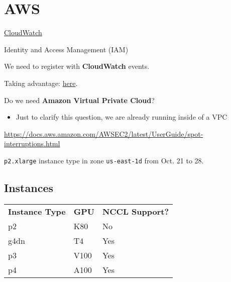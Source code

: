 \chapter{AWS}
\label{ch:aws}

\href{https://docs.aws.amazon.com/cloudwatch/index.html}{CloudWatch}

Identity and Access Management (IAM)

We need to register with \textbf{CloudWatch} events.

Taking advantage:
\href{https://aws.amazon.com/blogs/compute/taking-advantage-of-amazon-ec2-spot-instance-interruption-notices/}{here}.

Do we need \textbf{Amazon Virtual Private Cloud}?
\begin{itemize}
    \item Just to clarify this question, we are already running inside of a VPC
\end{itemize}

\url{https://docs.aws.amazon.com/AWSEC2/latest/UserGuide/spot-interruptions.html}




\texttt{p2.xlarge} instance type in zone \texttt{us-east-1d} from Oct. 21 to 28.




\section{Instances}
\vspace{-2em}
\begin{table}
  \begin{tabular}{|l|l|l|}
    \textbf{Instance Type} & \textbf{GPU} & \textbf{NCCL Support?} \\
    p2 & K80 & No \\
    g4dn & T4 & Yes \\
    p3 & V100 & Yes \\
    p4 & A100 & Yes
  \end{tabular}
\end{table}
